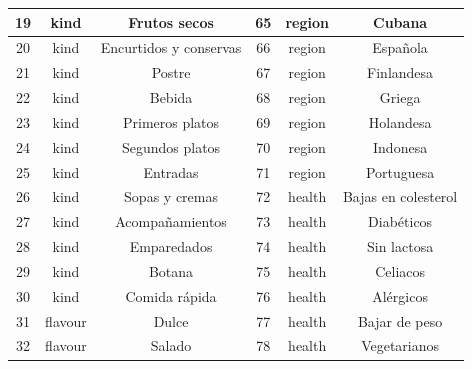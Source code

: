 \begin{table}[h]
\begin{center}
\begin{tabular}{ | c | c | c | c | c | c |}
            \midrule
            19 & kind  & Frutos secos & 65 & region  & Cubana \\
            \midrule
            20 & kind  & Encurtidos y conservas & 66 & region  & Española \\
            \midrule
            21 & kind  & Postre & 67 & region  & Finlandesa \\
            \midrule
            22 & kind  & Bebida & 68 & region  & Griega \\
            \midrule
            23 & kind  & Primeros platos & 69 & region  & Holandesa \\
            \midrule
            24 & kind  & Segundos platos & 70 & region  & Indonesa \\
            \midrule
            25 & kind  & Entradas & 71 & region  & Portuguesa \\
            \midrule
            26 & kind  & Sopas y cremas & 72 & health  & Bajas en colesterol \\
            \midrule
            27 & kind  & Acompañamientos & 73 & health  & Diabéticos \\
            \midrule
            28 & kind  & Emparedados & 74 & health  & Sin lactosa \\
            \midrule
            29 & kind  & Botana & 75 & health  & Celiacos \\
            \midrule
            30 & kind  & Comida rápida & 76 & health  & Alérgicos \\
            \midrule
            31 & flavour  & Dulce & 77 & health  & Bajar de peso \\
            \midrule
            32 & flavour  & Salado & 78 & health  & Vegetarianos \\
            \bottomrule
          \end{tabular}
        \end{center}
      \end{table}
      \clearpage
